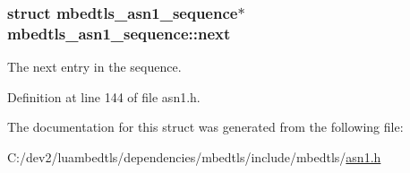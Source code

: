 \hypertarget{structmbedtls__asn1__sequence_ac81969ddae2ace4340503530588d83e1}{
\subsubsection[{next}]{\setlength{\rightskip}{0pt plus 5cm}struct {\bf mbedtls\-\_\-asn1\-\_\-sequence}$\ast$ mbedtls\-\_\-asn1\-\_\-sequence\-::next}}\label{structmbedtls__asn1__sequence_ac81969ddae2ace4340503530588d83e1}
The next entry in the sequence. 

Definition at line 144 of file asn1.\-h.



The documentation for this struct was generated from the following file\-:\begin{DoxyCompactItemize}
\item 
C\-:/dev2/luambedtls/dependencies/mbedtls/include/mbedtls/\hyperlink{asn1_8h}{asn1.\-h}\end{DoxyCompactItemize}
